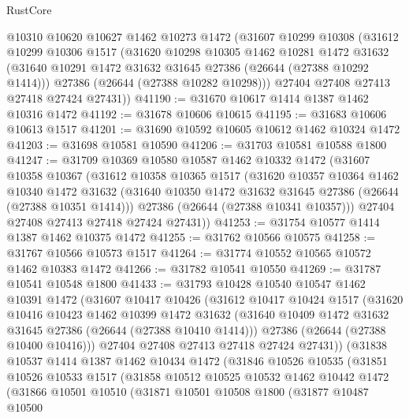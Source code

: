 \begin{lexlean}{RustCore}
\begin{coremodule}
    @10310
    @10620
    @10627
    @1462
    @10273
    @1472
    (@31607
      @10299
      @10308
      (@31612
        @10299
        @10306
        @1517
        (@31620
          @10298
          @10305
          @1462
          @10281
          @1472
          @31632
          (@31640 @10291 @1472 @31632 @31645 @27386 (@26644 (@27388 @10292 @1414)))
          @27386
          (@26644 (@27388 @10282 @10298)))
        @27404
        @27408
        @27413
        @27418
        @27424
        @27431))
@41190 := @31670 @10617 @1414 @1387 @1462 @10316 @1472
@41192 := @31678 @10606 @10615
@41195 := @31683 @10606 @10613 @1517
@41201 := @31690 @10592 @10605 @10612 @1462 @10324 @1472
@41203 := @31698 @10581 @10590
@41206 := @31703 @10581 @10588 @1800
@41247 := @31709
    @10369
    @10580
    @10587
    @1462
    @10332
    @1472
    (@31607
      @10358
      @10367
      (@31612
        @10358
        @10365
        @1517
        (@31620
          @10357
          @10364
          @1462
          @10340
          @1472
          @31632
          (@31640 @10350 @1472 @31632 @31645 @27386 (@26644 (@27388 @10351 @1414)))
          @27386
          (@26644 (@27388 @10341 @10357)))
        @27404
        @27408
        @27413
        @27418
        @27424
        @27431))
@41253 := @31754 @10577 @1414 @1387 @1462 @10375 @1472
@41255 := @31762 @10566 @10575
@41258 := @31767 @10566 @10573 @1517
@41264 := @31774 @10552 @10565 @10572 @1462 @10383 @1472
@41266 := @31782 @10541 @10550
@41269 := @31787 @10541 @10548 @1800
@41433 := @31793
    @10428
    @10540
    @10547
    @1462
    @10391
    @1472
    (@31607
      @10417
      @10426
      (@31612
        @10417
        @10424
        @1517
        (@31620
          @10416
          @10423
          @1462
          @10399
          @1472
          @31632
          (@31640 @10409 @1472 @31632 @31645 @27386 (@26644 (@27388 @10410 @1414)))
          @27386
          (@26644 (@27388 @10400 @10416)))
        @27404
        @27408
        @27413
        @27418
        @27424
        @27431))
    (@31838
      @10537
      @1414
      @1387
      @1462
      @10434
      @1472
      (@31846
        @10526
        @10535
        (@31851
          @10526
          @10533
          @1517
          (@31858
            @10512
            @10525
            @10532
            @1462
            @10442
            @1472
            (@31866
              @10501
              @10510
              (@31871
                @10501
                @10508
                @1800
                (@31877
                  @10487
                  @10500

\end{coremodule}
\end{lexlean}
